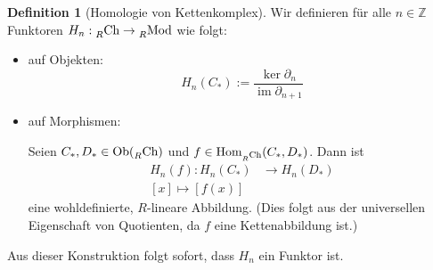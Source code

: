 \documentclass[a4paper,twoside,10pt]{scrreprt}
\DeclareMathOperator{\img}{im}
\newcommand{\Z}{\mathbb{Z}}
\theoremstyle{definition}
\newtheorem{definition}[satz]{Definition}
\begin{document}
\begin{definition}[Homologie von Kettenkomplex]
Wir definieren für alle $n\in \Z$ Funktoren $H_n:\prescript{}{R}{\text{Ch}}\to \prescript{}{R}{\text{Mod}}$ wie folgt:
\begin{itemize}
\item auf Objekten:
\begin{equation*}
H_n(C_*):=\frac{\ker\partial_n}{\img\partial_{n+1}}
\end{equation*}
\item auf Morphismen:\par
Seien $C_*,D_*\in \text{Ob}(\prescript{}{R}{\text{Ch}})$ und $f\in \text{Hom}_{\prescript{}{R}{\text{Ch}}}(C_*,D_*)$. Dann ist 
\begin{align*}
H_n(f):H_n(C_*)&\to H_n(D_*)\\
[x]\mapsto [f(x)]
\end{align*}
eine wohldefinierte, $R$-lineare Abbildung. (Dies folgt aus der universellen Eigenschaft von Quotienten, da $f$ eine Kettenabbildung ist.)
\end{itemize}
Aus dieser Konstruktion folgt sofort, dass $H_n$ ein Funktor ist.
\end{definition}
\end{document}
